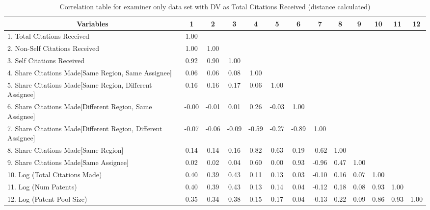 \begin{table}[htbp]\centering \caption{Correlation table for examiner only data set with DV as Total Citations Received (distance calculated)\label{e.tcorrelation}}
\scriptsize
\singlespacing
\begin{tabular}{l  c  c  c  c  c  c  c  c  c  c  c  c }\hline\hline
\multicolumn{1}{c}{Variables} &1&2&3&4&5&6&7&8&9&10&11&12\\ \hline
1. Total Citations Received&1.00\\
2. Non-Self Citations Received&1.00&1.00\\
3. Self Citations Received&0.92&0.90&1.00\\
4. Share Citations Made[Same Region, Same Assignee]&0.06&0.06&0.08&1.00\\
5. Share Citations Made[Same Region, Different Assignee]&0.16&0.16&0.17&0.06&1.00\\
6. Share Citations Made[Different Region, Same Assignee]&-0.00&-0.01&0.01&0.26&-0.03&1.00\\
7. Share Citations Made[Different Region, Different Assignee]&-0.07&-0.06&-0.09&-0.59&-0.27&-0.89&1.00\\
8. Share Citations Made[Same Region]&0.14&0.14&0.16&0.82&0.63&0.19&-0.62&1.00\\
9. Share Citations Made[Same Assignee]&0.02&0.02&0.04&0.60&0.00&0.93&-0.96&0.47&1.00\\
10. Log (Total Citations Made)&0.40&0.39&0.43&0.11&0.13&0.03&-0.10&0.16&0.07&1.00\\
11. Log (Num Patents)&0.40&0.39&0.43&0.13&0.14&0.04&-0.12&0.18&0.08&0.93&1.00\\
12. Log (Patent Pool Size)&0.35&0.34&0.38&0.15&0.17&0.04&-0.13&0.22&0.09&0.86&0.93&1.00\\
\hline \hline 
 \end{tabular}
\end{table}

